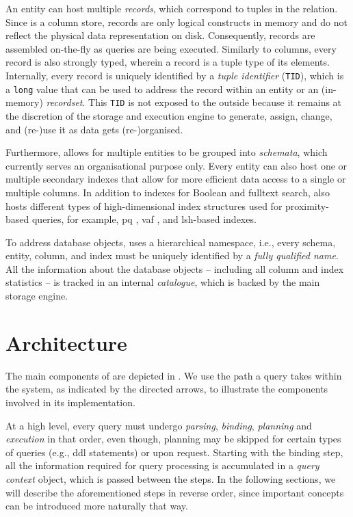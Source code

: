 An entity can host multiple \emph{records}, which correspond to tuples in the relation. Since \cottontail{} is a column store, records are only logical constructs in memory and do not reflect the physical data representation on disk. Consequently, records are assembled on-the-fly as queries are being executed. Similarly to columns, every record is also strongly typed, wherein a record is a tuple type of its elements. Internally, every record is uniquely identified by a \emph{tuple identifier} (\texttt{TID}), which is a \texttt{long} value that can be used to address the record within an entity or an (in-memory) \emph{recordset}. This \texttt{TID} is not exposed to the outside because it remains at the discretion of the storage and execution engine to generate, assign, change, and (re-)use it as data gets (re-)organised.

Furthermore, \cottontail{} allows for multiple entities to be grouped into \emph{schemata}, which currently serves an organisational purpose only. Every entity can also host one or multiple secondary indexes that allow for more efficient data access to a single or multiple columns. In addition to indexes for Boolean and fulltext search, \cottontail{} also hosts different types of high-dimensional index structures used for proximity-based queries, for example, \acrshort{pq} \cite{Jegou:2010Product}, \acrshort{vaf} \cite{Weber:1998Va}, and \acrshort{lsh}-based \cite{Indyk1998:Approximate} indexes.

To address database objects, \cottontail{} uses a hierarchical namespace, i.e., every schema, entity, column, and index must be uniquely identified by a \emph{fully qualified name}. All the information about the database objects -- including all column and index statistics  -- is tracked in an internal \emph{catalogue}, which is backed by the main storage engine.


\section{Architecture} 

The main components of \cottontail{} are depicted in . We use the path a query takes within the system, as indicated by the directed arrows, to illustrate the components involved in its implementation.

At a high level, every query must undergo \emph{parsing}, \emph{binding}, \emph{planning} and \emph{execution} in that order, even though, planning may be skipped for certain types of queries (e.g., \acrshort{ddl} statements) or upon request. Starting with the binding step, all the information required for query processing is accumulated in a \emph{query context} object, which is passed between the steps. In the following sections, we will describe the aforementioned steps in reverse order, since important concepts can be introduced more naturally that way.

